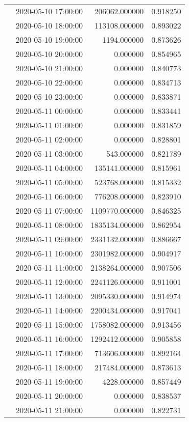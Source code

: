 \begin{tabular}{llrr}
 & 2020-05-10 17:00:00 & 206062.000000 & 0.918250 \\
 & 2020-05-10 18:00:00 & 113108.000000 & 0.893022 \\
 & 2020-05-10 19:00:00 & 1194.000000 & 0.873626 \\
 & 2020-05-10 20:00:00 & 0.000000 & 0.854965 \\
 & 2020-05-10 21:00:00 & 0.000000 & 0.840773 \\
 & 2020-05-10 22:00:00 & 0.000000 & 0.834713 \\
 & 2020-05-10 23:00:00 & 0.000000 & 0.833871 \\
 & 2020-05-11 00:00:00 & 0.000000 & 0.833441 \\
 & 2020-05-11 01:00:00 & 0.000000 & 0.831859 \\
 & 2020-05-11 02:00:00 & 0.000000 & 0.828801 \\
 & 2020-05-11 03:00:00 & 543.000000 & 0.821789 \\
 & 2020-05-11 04:00:00 & 135141.000000 & 0.815961 \\
 & 2020-05-11 05:00:00 & 523768.000000 & 0.815332 \\
 & 2020-05-11 06:00:00 & 776208.000000 & 0.823910 \\
 & 2020-05-11 07:00:00 & 1109770.000000 & 0.846325 \\
 & 2020-05-11 08:00:00 & 1835134.000000 & 0.862954 \\
 & 2020-05-11 09:00:00 & 2331132.000000 & 0.886667 \\
 & 2020-05-11 10:00:00 & 2301982.000000 & 0.904917 \\
 & 2020-05-11 11:00:00 & 2138264.000000 & 0.907506 \\
 & 2020-05-11 12:00:00 & 2241126.000000 & 0.911001 \\
 & 2020-05-11 13:00:00 & 2095330.000000 & 0.914974 \\
 & 2020-05-11 14:00:00 & 2200434.000000 & 0.917041 \\
 & 2020-05-11 15:00:00 & 1758082.000000 & 0.913456 \\
 & 2020-05-11 16:00:00 & 1292412.000000 & 0.905858 \\
 & 2020-05-11 17:00:00 & 713606.000000 & 0.892164 \\
 & 2020-05-11 18:00:00 & 217484.000000 & 0.873613 \\
 & 2020-05-11 19:00:00 & 4228.000000 & 0.857449 \\
 & 2020-05-11 20:00:00 & 0.000000 & 0.838537 \\
 & 2020-05-11 21:00:00 & 0.000000 & 0.822731 \\

\end{tabular}
